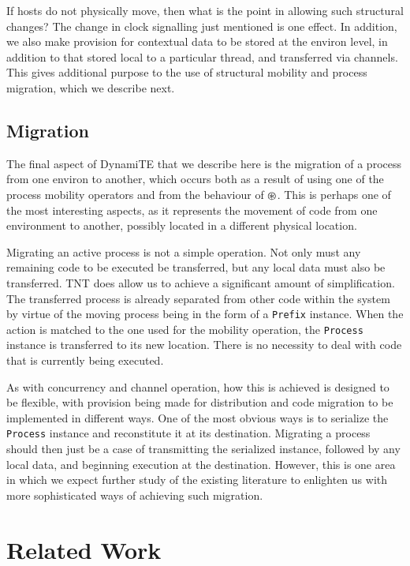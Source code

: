 \documentclass{acm_proc_article-sp}
\begin{document}
If hosts do not physically move, then what is the point in allowing such
structural changes?  The change in clock signalling just mentioned is
one effect.  In addition, we also make provision for contextual data to
be stored at the environ level, in addition to that stored local to a
particular thread, and transferred via channels.  This gives additional
purpose to the use of structural mobility and process migration, which
we describe next.

\subsection{Migration}
\label{migration}

The final aspect of DynamiTE that we describe here is the migration of a
process from one environ to another, which occurs both as a result of
using one of the process mobility operators and from the behaviour of
$\tntopen$.  This is perhaps one of the most interesting aspects, as it
represents the movement of code from one environment to another,
possibly located in a different physical location.

Migrating an active process is not a simple operation.  Not only must
any remaining code to be executed be transferred, but any local data
must also be transferred.  TNT does allow us to achieve a significant
amount of simplification.  The transferred process is already separated
from other code within the system by virtue of the moving process being
in the form of a \texttt{Prefix} instance.  When the action is matched
to the one used for the mobility operation, the \texttt{Process}
instance is transferred to its new location.  There is no necessity to
deal with code that is currently being executed.

As with concurrency and channel operation, how this is achieved is
designed to be flexible, with provision being made for distribution and
code migration to be implemented in different ways.  One of the most
obvious ways is to serialize the \texttt{Process} instance and
reconstitute it at its destination.  Migrating a process should then
just be a case of transmitting the serialized instance, followed by any
local data, and beginning execution at the destination.  However, this
is one area in which we expect further study of the existing literature
to enlighten us with more sophisticated ways of achieving such
migration.

\section{Related Work}
\label{relatedwork}
\end{document}

